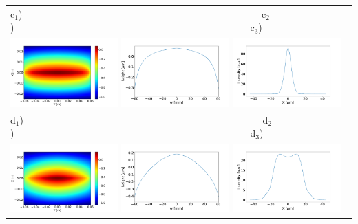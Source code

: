 \documentclass[aps,pra,showpacs,twocolumn,amsmath,amssymb,superscriptaddress,nofootinbib]{revtex4}
\begin{document}
\begin{center}
\begin{tabular}{l}
   c$_1$)~~~~~~~~~~~~~~~~~~~~~~~~~~~~~~~~~~~~~~~~~~~~~~~~~
   c$_2$)~~~~~~~~~~~~~~~~~~~~~~~~~~~~~~~~~~~~~~~~~~~~~~~~~c$_3$)\\
   \includegraphics[width=0.32\textwidth]{figures/water1_2d.pdf}
   \includegraphics[width=0.32\textwidth]{figures/deformation3.pdf}
   \includegraphics[width=0.32\textwidth]{figures/intensity3.pdf} \\


   d$_1$)~~~~~~~~~~~~~~~~~~~~~~~~~~~~~~~~~~~~~~~~~~~~~~~~~
   d$_2$)~~~~~~~~~~~~~~~~~~~~~~~~~~~~~~~~~~~~~~~~~~~~~~~~~d$_3$)\\
   \includegraphics[width=0.32\textwidth]{figures/water2_2d.pdf}
   \includegraphics[width=0.32\textwidth]{figures/deformation4.pdf}
   \includegraphics[width=0.32\textwidth]{figures/intensity4.pdf}\\

   \end{tabular}
  \end{center}
\end{document}
